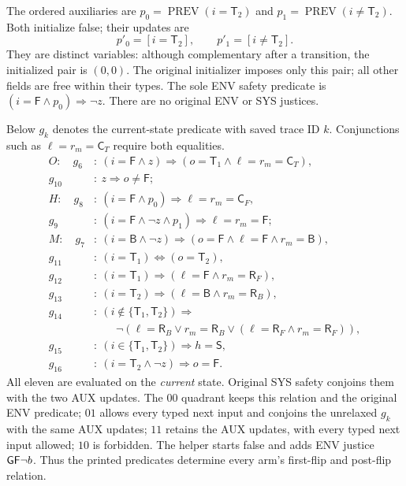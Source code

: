 The ordered auxiliaries are
$p_0=\operatorname{PREV}(i=\mathsf T_2)$ and
$p_1=\operatorname{PREV}(i\ne\mathsf T_2)$. Both initialize false;
their updates are
\[
p'_0=[i=\mathsf T_2],\qquad p'_1=[i\ne\mathsf T_2].
\]
They are distinct variables: although complementary after a transition,
the initialized pair is $(0,0)$. The original initializer imposes only
this pair; all other fields are free within their types. The sole ENV
safety predicate is $(i=\mathsf F\land p_0)\Rightarrow\neg z$.
There are no original ENV or SYS justices.

Below $g_k$ denotes the current-state predicate with saved trace ID $k$.
Conjunctions such as $\ell=r_m=\mathsf C_T$ require both equalities.
\begin{align*}
O:\quad g_6&:\ (i=\mathsf F\land z)\Rightarrow
  (o=\mathsf T_1\land\ell=r_m=\mathsf C_T),\\
g_{10}&:\ z\Rightarrow o\ne\mathsf F;\\[2pt]
H:\quad g_8&:\ (i=\mathsf F\land p_0)\Rightarrow\ell=r_m=\mathsf C_F,\\
g_9&:\ (i=\mathsf F\land\neg z\land p_1)\Rightarrow\ell=r_m=\mathsf F;\\[2pt]
M:\quad g_7&:\ (i=\mathsf B\land\neg z)\Rightarrow
  (o=\mathsf F\land\ell=\mathsf F\land r_m=\mathsf B),\\
g_{11}&:\ (i=\mathsf T_1)\Leftrightarrow(o=\mathsf T_2),\\
g_{12}&:\ (i=\mathsf T_1)\Rightarrow(\ell=\mathsf F\land r_m=\mathsf R_F),\\
g_{13}&:\ (i=\mathsf T_2)\Rightarrow(\ell=\mathsf B\land r_m=\mathsf R_B),\\
g_{14}&:\ (i\notin\{\mathsf T_1,\mathsf T_2\})\Rightarrow\\
&\qquad\neg(\ell=\mathsf R_B\lor r_m=\mathsf R_B
             \lor(\ell=\mathsf R_F\land r_m=\mathsf R_F)),\\
g_{15}&:\ (i\in\{\mathsf T_1,\mathsf T_2\})\Rightarrow h=\mathsf S,\\
g_{16}&:\ (i=\mathsf T_2\land\neg z)\Rightarrow o=\mathsf F.
\end{align*}
All eleven are evaluated on the \emph{current} state. Original SYS
safety conjoins them with the two AUX updates. The $00$ quadrant keeps
this relation and the original ENV predicate; $01$ allows every typed
next input and conjoins the unrelaxed $g_k$ with the same AUX updates;
$11$ retains the AUX updates, with every typed next input allowed;
$10$ is forbidden. The helper starts false and adds ENV justice
$\mathsf{G}\mathsf{F}\neg b$. Thus the printed predicates determine every arm's
first-flip and post-flip relation.

